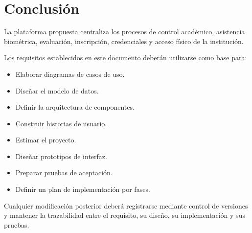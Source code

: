 \documentclass[12pt,a4paper]{article}
\begin{document}
\section{Conclusión}

La plataforma propuesta centraliza los procesos de control académico, asistencia
biométrica, evaluación, inscripción, credenciales y acceso físico de la
institución.

Los requisitos establecidos en este documento deberán utilizarse como base para:

\begin{itemize}[leftmargin=*]
\item Elaborar diagramas de casos de uso.
\item Diseñar el modelo de datos.
\item Definir la arquitectura de componentes.
\item Construir historias de usuario.
\item Estimar el proyecto.
\item Diseñar prototipos de interfaz.
\item Preparar pruebas de aceptación.
\item Definir un plan de implementación por fases.
\end{itemize}

Cualquier modificación posterior deberá registrarse mediante control de
versiones y mantener la trazabilidad entre el requisito, su diseño, su
implementación y sus pruebas.
\end{document}
